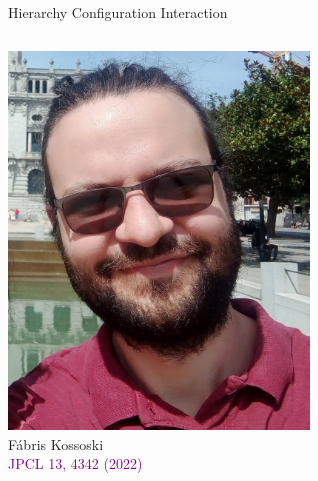 \documentclass[aspectratio=169,9pt]{beamer}
\newcommand{\pub}[1]{{\small \textcolor{purple}{#1}}}
\begin{document}


\begin{frame}{Hierarchy Configuration Interaction}

        \begin{columns}
        \begin{column}{0.25\textwidth}
        \centering
\includegraphics[width=0.6\textwidth]{fig/Fabris_2021.png}
\\
Fábris Kossoski
\\
\bigskip
        \centering
	\pub{JPCL 13, 4342 (2022)}
        \end{column}


\end{columns}
\end{frame}
\end{document}
